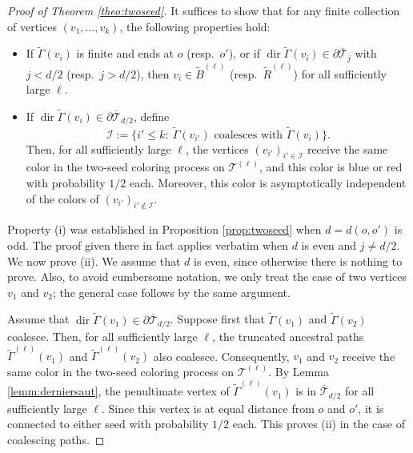 \documentclass[french]{article}
\newcommand{\T}{\mathcal{T}}
\renewcommand{\dir}{\mathop{dir}}
\renewcommand{\1}{\mathds{1}}
\begin{document}
\begin{proof}[Proof of Theorem \ref{theo:twoseed}]
It suffices to show that for any finite collection of vertices $(v_1,\ldots,v_k)$, the following properties hold:
\begin{itemize}
    \item[(i)] If $\tilde{\Gamma}(v_i)$ is finite and ends at $o$ (resp.\ $o'$), or if $\dir \tilde{\Gamma}(v_i)\in \partial \overline{\T}_j$ with $j<d/2$ (resp.\ $j>d/2$), then $v_i\in \tilde{B}^{(\ell)}$ (resp.\ $\tilde{R}^{(\ell)}$) for all sufficiently large $\ell$.

    \item[(ii)] If $\dir \tilde{\Gamma}(v_i)\in \partial \overline{\T}_{d/2}$, define
    $$
    \mathcal I:=\bigl\{i'\le k:\ \tilde{\Gamma}(v_{i'}) \text{ coalesces with } \tilde{\Gamma}(v_i)\bigr\}.
    $$
    Then, for all sufficiently large $\ell$, the vertices $(v_{i'})_{i'\in\mathcal I}$ receive the same color in the two-seed coloring process on $\T^{(\ell)}$, and this color is blue or red with probability $1/2$ each. Moreover, this color is asymptotically independent of the colors of $(v_{i'})_{i'\notin\mathcal I}$.
\end{itemize}

Property (i) was established in Proposition \ref{prop:twoseed} when $d=d(o,o')$ is odd. The proof given there in fact applies verbatim when $d$ is even and $j \neq d/2$. We now prove (ii). We assume that $d$ is even, since otherwise there is nothing to prove. Also, to avoid cumbersome notation, we only treat the case of two vertices $v_1$ and $v_2$; the general case follows by the same argument. 
\medskip

Assume that $\dir \tilde{\Gamma}(v_1)\in \partial \overline{\T}_{d/2}$. Suppose first that $\tilde{\Gamma}(v_1)$ and $\tilde{\Gamma}(v_2)$ coalesce. Then, for all sufficiently large $\ell$, the truncated ancestral paths $\tilde{\Gamma}^{(\ell)}(v_1)$ and $\tilde{\Gamma}^{(\ell)}(v_2)$ also coalesce. Consequently, $v_1$ and $v_2$ receive the same color in the two-seed coloring process on $\T^{(\ell)}$. By Lemma \ref{lemm:derniersaut}, the penultimate vertex of $\tilde{\Gamma}^{(\ell)}(v_1)$ is in $\overline{\T}_{d/2}$ for all sufficiently large $\ell$. Since this vertex is at equal distance from $o$ and $o'$, it is connected to either seed with probability $1/2$ each. This proves (ii) in the case of coalescing paths.

\medskip


\end{proof}
\end{document}
